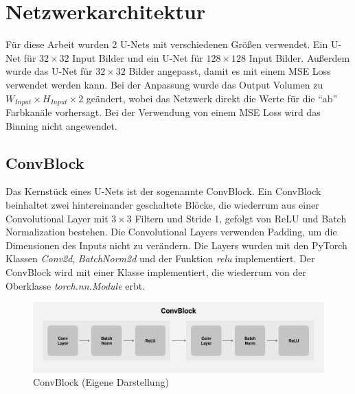 \section{Netzwerkarchitektur}
Für diese Arbeit wurden 2 U-Nets mit verschiedenen Größen verwendet. Ein U-Net für $ 32 \times 32 $ Input Bilder und ein U-Net für $ 128 \times 128 $ 
Input Bilder. Außerdem wurde das U-Net für $ 32 \times 32 $ Bilder angepasst, damit es mit einem MSE Loss verwendet werden kann. Bei der Anpassung wurde
das Output Volumen zu $ W_{Input} \times H_{Input} \times 2 $ geändert, wobei das Netzwerk direkt die Werte für die ``ab'' Farbkanäle vorhersagt.
Bei der Verwendung von einem MSE Loss wird das Binning nicht angewendet.
 
\subsection{ConvBlock}
Das Kernstück eines U-Nets ist der sogenannte ConvBlock. Ein ConvBlock beinhaltet zwei hintereinander geschaltete Blöcke, die wiederrum
aus einer Convolutional Layer mit $3 \times 3$ Filtern und Stride 1, gefolgt von ReLU und Batch Normalization bestehen. 
Die Convolutional Layers verwenden Padding, um die Dimensionen des Inputs nicht zu verändern. Die Layers wurden mit den PyTorch 
Klassen \textit{Conv2d}, \textit{BatchNorm2d} und der Funktion \textit{relu} implementiert. Der ConvBlock wird mit einer Klasse implementiert,
die wiederrum von der Oberklasse \textit{torch.nn.Module} erbt.

\begin{figure}[H]
  \centering
  \includegraphics[width=1\textwidth]{resources/networks/convblock.png}
  \caption{ConvBlock (Eigene Darstellung)}
  \label{image:convBlock}
\end{figure}


